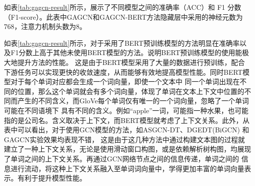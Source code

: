 如表\ref{tab:gagcn-result}所示，展示了不同模型之间的准确率（ACC）和 F1 分数（F1-score）。此表中GAGCN和GAGCN-BERT方法隐藏层中采用的神经元数为768，注意力机制头数为8。

如表\ref{tab:gagcn-result}所示，对于采用了BERT预训练模型的方法明显在准确率以及F1分数上高于其他未使用BERT模型的方法。说明BERT预训练模型的使用能极大地提升方法的性能。
这是由于BERT模型采用了大量的数据进行预训练，配合下游任务可以实现更快的收敛速度，从而能够有效地提高模型性能。同时BERT模型对于每个单词对应都会生成一个词向量，即使一个文本中
同一个单词出现在不同的位置，那么这个单词就会有多个词向量，体现了单词在文本上下文中位置的不同而产生的不同含义，而GloVe每个单词仅有唯一的一个词向量，忽略了一个单词可能在不同语境下
具有不同的含义。例如“apple”一词，可能指一种水果，也可能指的是公司名。含义取决于上下文，而BERT模型就考虑了上下文关系。此外，从表中可以看出，对于使用GCN模型的方法，如ASGCN-DT、DGEDT(BiGCN)
和GAGCN实验效果均表现不错，
这是由于这几种方法中通过构建文本图的过程就建立了一种上下文关系，无论是使用滑动窗口构图，或是依赖解析树构图，均展现了单词之间的上下文关系。再通过GCN网络节点之间的信息传递，单词之间的
信息进行流动，将这种上下文关系融入至单词词向量中，学得更加丰富的单词向量表示。有利于提升模型性能。

